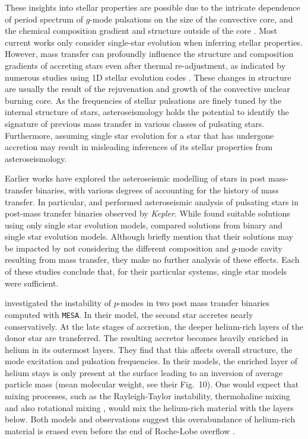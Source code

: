 \documentclass[twocolumn, twocolappendix, oneside]{aastex631}
\newcommand{\gmode}{$g$-mode\xspace}
\newcommand{\mesa}{\texttt{MESA}\xspace}
\begin{document}
These insights into stellar properties are possible due to the intricate dependence of period spectrum of \gmode pulsations on the size of the convective core, and the chemical composition gradient and structure outside of the core \citep[e.g.][]{Dziembowski1993,Miglio+2008,Hatta+2023}. Most current works only consider single-star evolution when inferring stellar properties. However, mass transfer can profoundly influence the structure and composition gradients of accreting stars even after thermal re-adjustment, as indicated by numerous studies using 1D stellar evolution codes \citep{Braun+1995,Renzo+2021,Miszuda+2021}. These changes in structure are usually the result of the rejuvenation and growth of the convective nuclear burning core. As the frequencies of stellar pulsations are finely tuned by the internal structure of stars, asteroseismology holds the potential to identify the signature of previous mass transfer in various classes of pulsating stars. Furthermore, assuming single star evolution for a star that has undergone accretion may result in misleading inferences of its stellar properties from asteroseismology.

Earlier works have explored the asteroseismic modelling of stars in post mass-transfer binaries, with various degrees of accounting for the history of mass transfer. In particular, \citet{Guo2017b, Guo+2017:2017ApJ...837..114G} and \citet{Chen2021} performed asteroseismic analysis of pulsating stars in post-mass transfer binaries observed by {\it Kepler}. While \citet{Guo2017b,Guo+2017:2017ApJ...837..114G} found suitable solutions using only single star evolution models, \citet{Chen2021} compared solutions from binary and single star evolution models. Although \citet{Guo+2017:2017ApJ...837..114G} briefly mention that their solutions may be impacted by not considering the different composition and \gmode cavity resulting from mass transfer, they make no further analysis of these effects. Each of these studies conclude that, for their particular systems, single star models were sufficient. 

\citet{Miszuda+2021,Miszuda+2022:2022MNRAS.514..622M} investigated the instability of $p$-modes in two post mass transfer binaries computed with \mesa. In their model, the second star accretes nearly conservatively. At the late stages of accretion, the deeper helium-rich layers of the donor star are transferred. The resulting accretor becomes heavily enriched in helium in its outermost layers. They find that this affects overall structure, the mode excitation and pulsation frequencies. In their models, the enriched layer of helium stays is only present at the surface leading to an inversion of average particle mass (mean molecular weight, see their Fig.~10). One would expect that mixing processes, such as the Rayleigh-Taylor instability, thermohaline mixing and also rotational mixing \citep{Kippenhahn+1980, Cantiello+2007}, would mix the helium-rich material with the layers below. Both models and observations suggest this overabundance of helium-rich material is erased even before the end of Roche-Lobe overflow \citep{Renzo+2021}.
\end{document}
